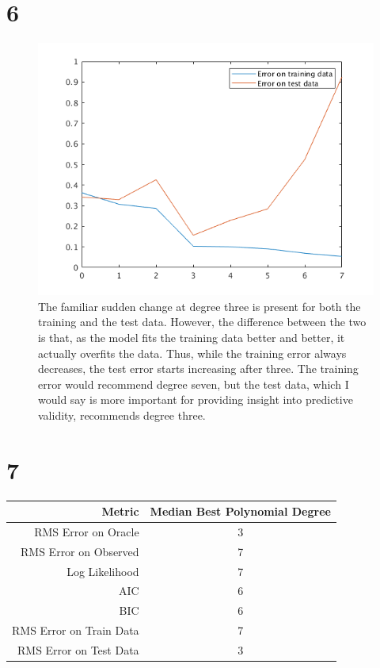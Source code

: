 \documentclass{article}
\begin{document}
\section{6}

\begin{figure}[!ht]
	\centering
	\includegraphics[width=120mm]{q6-rms-err.png}
	\caption{The familiar sudden change at degree three is present for both the 
        training and the test data. However, the difference between the two is 
        that, as the model fits the training data better and better, it 
        actually overfits the data. Thus, while the training error always 
        decreases, the test error starts increasing after three. The training 
        error would recommend degree seven, but the test data, which I would 
        say is more important for providing insight into predictive validity, 
        recommends degree three.}
\end{figure}

\section{7}

\begin{tabular}{r | c}
	Metric & Median Best Polynomial Degree \\
	\hline
	RMS Error on Oracle     & 3 \\
    RMS Error on Observed   & 7 \\
    Log Likelihood          & 7 \\
    AIC                     & 6 \\
    BIC                     & 6 \\
    RMS Error on Train Data & 7 \\
    RMS Error on Test Data  & 3 \\
\end{tabular}
\end{document}
